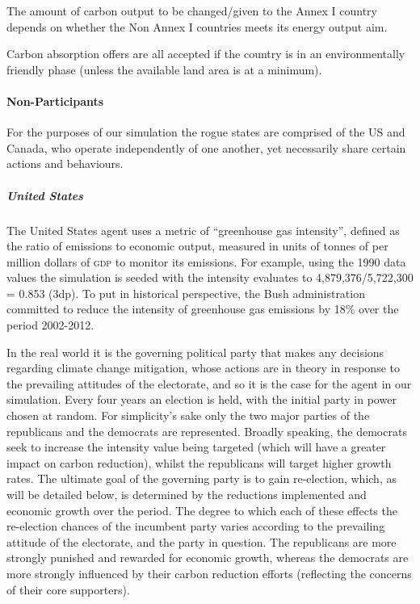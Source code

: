 The amount of carbon output to be changed/given to the Annex I country depends on whether the Non Annex I countries meets its energy output aim.

Carbon absorption offers are all accepted if the country is in an environmentally friendly phase (unless the available land area is at a minimum). 

\paragraph{Non-Participants}

For the purposes of our simulation the rogue states are comprised of the US and Canada, who operate independently of one another, yet necessarily share certain actions and behaviours. 

\subparagraph{United States}

The United States agent uses a metric of ``greenhouse gas intensity'', defined as the ratio of emissions to economic output, measured in units of tonnes of \CO per million dollars of \textsc{gdp} to monitor its emissions. For example, using the 1990 data values the simulation is seeded with the intensity evaluates to 4,879,376/5,722,300 = 0.853 (3dp). To put in historical perspective, the Bush administration committed to reduce the intensity of greenhouse gas emissions by 18\% over the period 2002-2012.

In the real world it is the governing political party that makes any decisions regarding climate change mitigation, whose actions are in theory in response to the prevailing attitudes of the electorate, and so it is the case for the agent in our simulation. Every four years an election is held, with the initial party in power chosen at random. For simplicity's sake only the two major parties of the republicans and the democrats are represented. Broadly speaking, the democrats seek to increase the intensity value being targeted (which will have a greater impact on carbon reduction), whilst the republicans will target higher growth rates. The ultimate goal of the governing party is to gain re-election, which, as will be detailed below, is determined by the reductions implemented and economic growth over the period. The degree to which each of these effects the re-election chances of the incumbent party varies according to the prevailing attitude of the electorate, and the party in question. The republicans are more strongly punished and rewarded for economic growth, whereas the democrats are more strongly influenced by their carbon reduction efforts (reflecting the concerns of their core supporters). 


